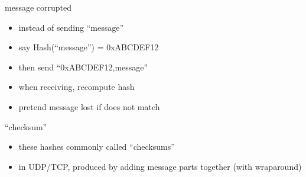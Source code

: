 \begin{frame}{message corrupted}
\begin{itemize}
\item instead of sending ``message''
\vspace{.5cm}
\item say Hash(``message'') = 0xABCDEF12
\item then send ``0xABCDEF12,message''
\vspace{.5cm}
\item when receiving, recompute hash
\item pretend message lost if does not match
\end{itemize}
\end{frame}

\begin{frame}{``checksum''}
\begin{itemize}
\item these hashes commonly called ``checksums''
\item in UDP/TCP, produced by adding message parts together (with wraparound)
\end{itemize}
\end{frame}
